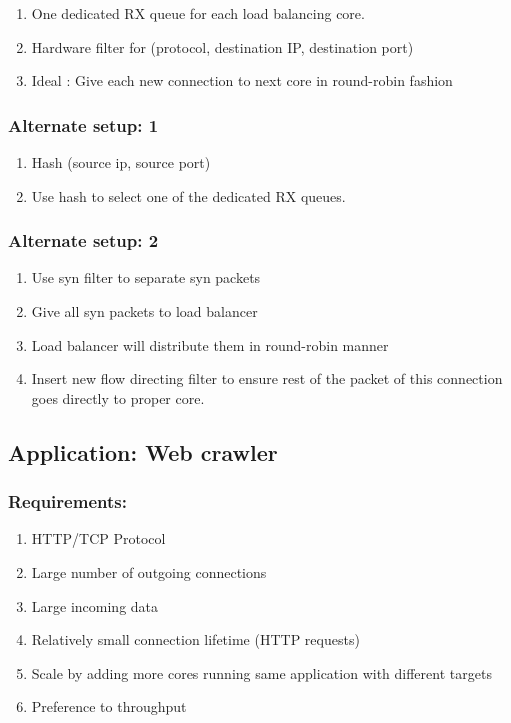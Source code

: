 \begin{enumerate}
    \item One dedicated RX queue for each load balancing core.
    \item Hardware filter for (protocol, destination IP, destination port)
    \item Ideal : Give each new connection to next core in round-robin fashion
\end{enumerate}

\subsubsection{Alternate setup: 1}
\begin{enumerate}
       \item Hash (source ip, source port)
       \item Use hash to select one of the dedicated RX queues.
\end{enumerate}

\subsubsection{Alternate setup: 2}
\begin{enumerate}
       \item Use syn filter to separate syn packets
       \item Give all syn packets to load balancer
       \item Load balancer will distribute them in round-robin manner
       \item Insert new flow directing filter to ensure rest of the packet of
        this connection goes directly to proper core.
\end{enumerate}


\subsection{Application: Web crawler}

\subsubsection{Requirements:}
\begin{enumerate}
    \item HTTP/TCP Protocol
    \item Large number of outgoing connections
    \item Large incoming data
    \item Relatively small connection lifetime (HTTP requests)
    \item Scale by adding more cores running same application with different
        targets
    \item Preference to throughput
\end{enumerate}

